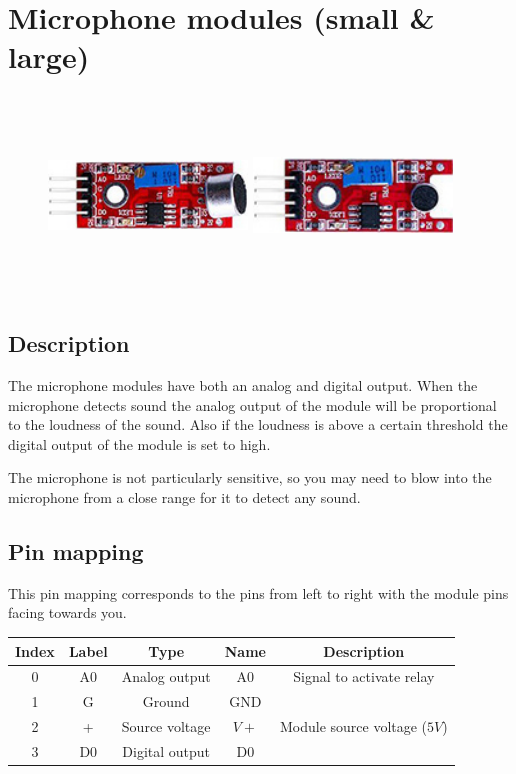 \section{Microphone modules (small \& large)}
\begin{figure}[H]
    \centering
    \includegraphics[angle=0, keepaspectratio=true, scale=1, width=200px, height=200px]{images/microphone_large.jpg}
    \includegraphics[angle=0, keepaspectratio=true, scale=1, width=200px, height=200px]{images/microphone_small.jpg}
\end{figure}
\subsection*{Description}
The microphone modules have both an analog and digital output. When the microphone detects sound the analog output of the module will be proportional to the loudness of the sound. Also if the loudness is above a certain threshold the digital output of the module is set to high.

The microphone is not particularly sensitive, so you may need to blow into the microphone from a close range for it to detect any sound.

\subsection*{Pin mapping}
This pin mapping corresponds to the pins from left to right with the module pins facing towards you.
\begin{table}[H]
    \centering
    \begin{tabular}{|c|c|c|c|c|}
    \hline
    Index &Label &Type &Name &Description\\ \hline
    0 &A0 &Analog output &A0 &Signal to activate relay \\ \hline
    1 &G &Ground &GND &\\ \hline
    2 &+ &Source voltage &$V+$ &Module source voltage ($5V$)\\ \hline
    3 &D0 &Digital output &D0 &\\ \hline
    \end{tabular}
\end{table}
